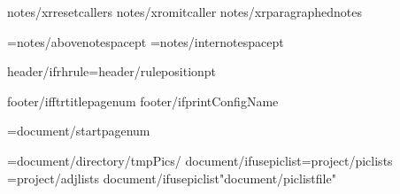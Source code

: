 {notes/xrresetcallers}
{notes/xromitcaller}
{notes/xrparagraphednotes}

\AboveNoteSpace={notes/abovenotespace}pt
\InterNoteSpace={notes/internotespace}pt

\def\HeaderPosition{{{header/headerposition}}}
\def\FooterPosition{{{header/footerposition}}}
{header/ifrhrule}\RHruleposition={header/ruleposition}pt
\def\RangeSeparator{{\kern.1em\char"2013\kern.1em}} %
\def\ChapterVerseSeparator{{\kern.02em{header/chvseparator}\kern.02em}} %

\def\RHevenleft{{{header/evenleft}}}
\def\RHevencenter{{{header/evencenter}}}
\def\RHevenright{{{header/evenright}}}

\def\RHoddleft{{{header/oddleft}}}
\def\RHoddcenter{{{header/oddcenter}}}
\def\RHoddright{{{header/oddright}}}

\def\RHnoVevenleft{{{header/noVevenleft}}}
\def\RHnoVevencenter{{{header/noVevencenter}}}
\def\RHnoVevenright{{{header/noVevenright}}}

\def\RHnoVoddleft{{{header/noVoddleft}}}
\def\RHnoVoddcenter{{{header/noVoddcenter}}}
\def\RHnoVoddright{{{header/noVoddright}}}


\def\RFoddcenter{{{footer/oddcenter}}}
\def\RFevencenter{{{footer/oddcenter}}}
\def\RFtitlecenter{{{footer/oddcenter}}}

{footer/ifftrtitlepagenum}\def\RFtitlecenter{{\pagenumber}}
{footer/ifprintConfigName}\def\RFtitlecenter{{{config/name}}}

\pageno={document/startpagenum}

\PicPath={{{document/directory}/tmpPics/}}
{document/ifusepiclist}\PicListPath={{{project/piclists}}}
\AdjListPath={{{project/adjlists}}}
{document/ifusepiclist}\openpiclist "{document/piclistfile}"

